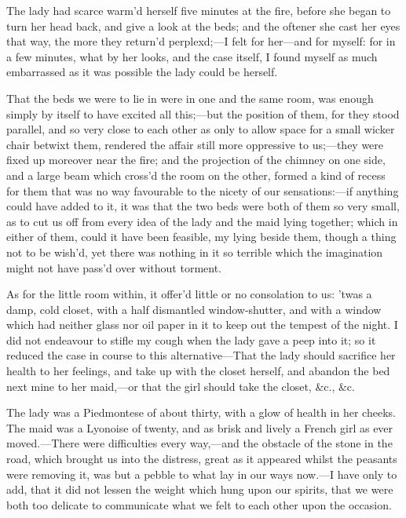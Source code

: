 \documentclass[twoside]{article}
\begin{document}
The lady had scarce warm’d herself five minutes at the fire, before she
began to turn her head back, and give a look at the beds; and the oftener
she cast her eyes that way, the more they return’d perplexd;—I felt for
her—and for myself: for in a few minutes, what by her looks, and the case
itself, I found myself as much embarrassed as it was possible the lady
could be herself.

That the beds we were to lie in were in one and the same room, was enough
simply by itself to have excited all this;—but the position of them, for
they stood parallel, and so very close to each other as only to allow
space for a small wicker chair betwixt them, rendered the affair still
more oppressive to us;—they were fixed up moreover near the fire; and the
projection of the chimney on one side, and a large beam which cross’d the
room on the other, formed a kind of recess for them that was no way
favourable to the nicety of our sensations:—if anything could have added
to it, it was that the two beds were both of them so very small, as to
cut us off from every idea of the lady and the maid lying together; which
in either of them, could it have been feasible, my lying beside them,
though a thing not to be wish’d, yet there was nothing in it so terrible
which the imagination might not have pass’d over without torment.

As for the little room within, it offer’d little or no consolation to us:
’twas a damp, cold closet, with a half dismantled window-shutter, and
with a window which had neither glass nor oil paper in it to keep out the
tempest of the night.  I did not endeavour to stifle my cough when the
lady gave a peep into it; so it reduced the case in course to this
alternative—That the lady should sacrifice her health to her feelings,
and take up with the closet herself, and abandon the bed next mine to her
maid,—or that the girl should take the closet, &c., &c.

The lady was a Piedmontese of about thirty, with a glow of health in her
cheeks.  The maid was a Lyonoise of twenty, and as brisk and lively a
French girl as ever moved.—There were difficulties every way,—and the
obstacle of the stone in the road, which brought us into the distress,
great as it appeared whilst the peasants were removing it, was but a
pebble to what lay in our ways now.—I have only to add, that it did not
lessen the weight which hung upon our spirits, that we were both too
delicate to communicate what we felt to each other upon the occasion.
\end{document}
